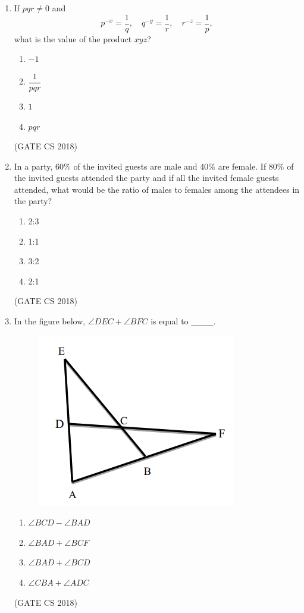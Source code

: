 \documentclass[12pt]{article}
\begin{document}
\begin{enumerate}
\item If $pqr \neq 0$ and 
$$p^{-x} = \frac{1}{q}, \quad q^{-y} = \frac{1}{r}, \quad r^{-z} = \frac{1}{p},$$ 
what is the value of the product $xyz$?

\begin{multicols}{4}
\begin{enumerate}
\item $-1$
\item $\dfrac{1}{pqr}$
\item $1$
\item $pqr$
\end{enumerate}
\end{multicols}
(GATE CS 2018)

\item In a party, $60\%$ of the invited guests are male and $40\%$ are female. If $80\%$ of the invited guests attended the party and if all the invited female guests attended, what would be the ratio of males to females among the attendees in the party?

\begin{multicols}{4}
\begin{enumerate}
\item 2:3
\item 1:1
\item 3:2
\item 2:1
\end{enumerate}
\end{multicols}
(GATE CS 2018)

\item In the figure below, $\angle DEC + \angle BFC$ is equal to $\_\_\_\_\_\_\_\_$.

\begin{figure}[H]
    \centering
    \includegraphics[width=0.5\columnwidth]{figs/ass6_0_q9.png}
    \caption{}
    \label{fig:placeholder}
\end{figure}

\begin{multicols}{2}
\begin{enumerate}
\item $\angle BCD - \angle BAD$
\item $\angle BAD + \angle BCF$
\item $\angle BAD + \angle BCD$
\item $\angle CBA + \angle ADC$
\end{enumerate}
\end{multicols}
(GATE CS 2018)


\end{enumerate}
\end{document}
